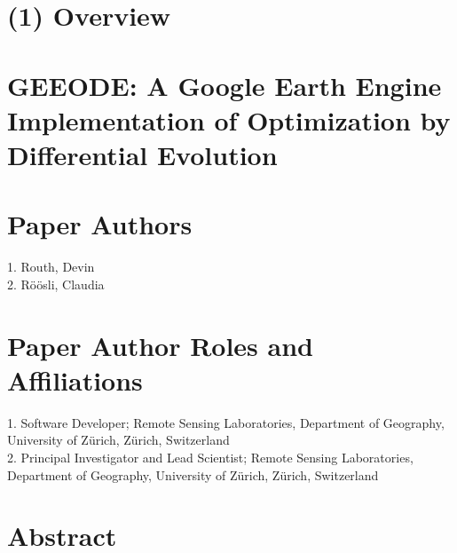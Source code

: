 \documentclass{jors}
\begin{document}
\section*{(1) Overview}

\vspace{0.5cm}

\section*{GEEODE: A Google Earth Engine Implementation of Optimization by Differential Evolution}

\section*{Paper Authors}

1. Routh, Devin \\ 2. Röösli, Claudia

\section*{Paper Author Roles and Affiliations}

1. Software Developer; Remote Sensing Laboratories, Department of Geography, University of Zürich, Zürich, Switzerland \\ 2. Principal Investigator and Lead Scientist; Remote Sensing Laboratories, Department of Geography, University of Zürich, Zürich, Switzerland

\section*{Abstract}
\end{document}

